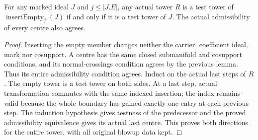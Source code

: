 \begin{lemma}
\label{hir:original-empty-boundary-test-history}
\leanok
{}
For any marked ideal $J$ and $j\leq |J.E|$, any actual tower $R$ is a
test tower of $\operatorname{insertEmpty}_j(J)$ if and only if it is a
test tower of $J$.  The actual admissibility of every centre also agrees.
\end{lemma}
\begin{proof}
Inserting the empty member changes neither the carrier, coefficient
ideal, mark nor cosupport.  A centre has the same closed submanifold and
cosupport conditions, and its normal-crossings condition agrees by the
previous lemma.  Thus its entire admissibility condition agrees.
Induct on the actual last steps of $R$.  The empty tower is a test tower
on both sides.  At a last step, actual transformation commutes with the
same indexed insertion; the index remains valid because the whole
boundary has gained exactly one entry at each previous step.  The
induction hypothesis gives testness of the predecessor and the proved
admissibility equivalence gives its actual last centre.  This proves
both directions for the entire tower, with all original blowup data kept.
\end{proof}

